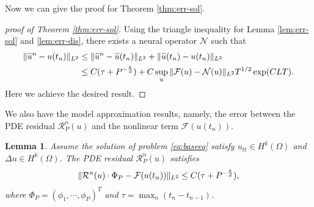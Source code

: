 \documentclass[preprint,12pt]{elsarticle}
\theoremstyle{plain}
\newtheorem{lemma}[theorem]{Lemma}
\numberwithin{figure}{section}
\numberwithin{table}{section}
\begin{document}
Now we can give the proof for Theorem \ref{thm:err-sol}.
\begin{proof}[proof of Theorem \ref{thm:err-sol}]
	Using the triangle inequality for Lemma \ref{lem:err-sol} and \ref{lem:err-dis}, there exists a neural operator $\mathcal{N}$ such that
	$$
	\begin{aligned}
		\|\widetilde{u}^n-u(t_n)\|_{L^2} &\le \|\widetilde{u}^n-\widetilde{u}(t_n)\|_{L^2} + \|\widetilde{u}(t_n)-u(t_n)\|_{L^2}\\
		&\le C(\tau+P^{-{k\over d}}) + C\sup_{u}\|\mathcal{F}(u)-\mathcal{N}(u)\|_{L^2} T^{1/2}\exp(CLT).
	\end{aligned}
	$$
	Here we achieve the desired result.
\end{proof}

We also have the model approximation results, namely, the error between the PDE residual $\mathcal{R}_P^n(u)$ and the nonlinear term $\mathcal{F}(u(t_n))$.
\begin{lemma}\label{thm:residual}
	Assume the solution of problem \eqref{eq:baseeq} satisfy $u_{tt}\in H^k(\Omega)$ and $\Delta u \in H^k(\Omega)$. The PDE residual $\mathcal{R}_P^n(u)$ satisfies
	\begin{equation}
		\|\mathcal{R}^n(u)\cdot \Phi_P-\mathcal{F}(u(t_n))\|_{L^2}\le C(\tau + P^{-{k\over d}}),
	\end{equation}
	where $\Phi_P=(\phi_1,\cdots,\phi_P)^T$ and $\tau=\max_n(t_n-t_{n-1})$.
\end{lemma}
\end{document}
